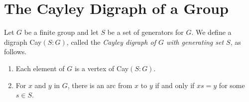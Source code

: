 \section{The Cayley Digraph of a Group}

\begin{definition}
	Let $G$ be a finite group and let $S$ be a set of generators for $G$. We define a digraph Cay$(S:G)$, called the \textit{Cayley digraph of $G$ with generating set $S$}, as follows.
	\begin{enumerate}
		\item Each element of $G$ is a vertex of Cay$(S:G)$.
		\item For $x$ and $y$ in $G$, there is an arc from $x$ to $y$ if and only if $xs=y$ for some $s \in S$.
	\end{enumerate}
\end{definition}
